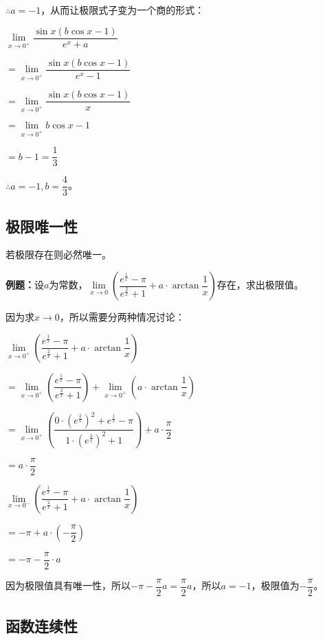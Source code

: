 \documentclass[UTF8, 12pt]{ctexart}
\begin{document}
$\therefore a=-1$，从而让极限式子变为一个商的形式：\medskip

$\lim\limits_{x\to 0^+}\dfrac{\sin x(b\cos x-1)}{e^x+a}$\medskip

$=\lim\limits_{x\to 0^+}\dfrac{\sin x(b\cos x-1)}{e^x-1}$\medskip

$=\lim\limits_{x\to 0^+}\dfrac{\sin x(b\cos x-1)}{x}$\medskip

$=\lim\limits_{x\to 0^+}b\cos x-1$\medskip

$=b-1=\dfrac{1}{3}$\medskip

$\therefore a=-1,b=\dfrac{4}{3}$。

\subsection{极限唯一性}

若极限存在则必然唯一。

\textbf{例题：}设$a$为常数，$\lim\limits_{x\to 0}\left(\dfrac{e^{\frac{1}{x}}-\pi}{e^{\frac{2}{x}}+1}+a\cdot\arctan\dfrac{1}{x}\right)$存在，求出极限值。

因为求$x\to 0$，所以需要分两种情况讨论：

\medskip

$\lim\limits_{x\to 0^+}\left(\dfrac{e^{\frac{1}{x}}-\pi}{e^{\frac{2}{x}}+1}+a\cdot\arctan\dfrac{1}{x}\right)$

$= \lim\limits_{x\to 0^+}\left(\dfrac{e^{\frac{1}{x}}-\pi}{e^{\frac{2}{x}}+1}\right)+\lim\limits_{x\to 0^+}\left(a\cdot\arctan\dfrac{1}{x}\right)$

$= \lim\limits_{x\to 0^+}\left(\dfrac{0\cdot\left(e^{\frac{2}{x}}\right)^2+e^{\frac{1}{x}}-\pi}{1\cdot\left(e^{\frac{2}{x}}\right)^2+1}\right)+a\cdot\dfrac{\pi}{2}$

$= a\cdot\dfrac{\pi}{2}$

\medskip

$\lim\limits_{x\to 0^-}\left(\dfrac{e^{\frac{1}{x}}-\pi}{e^{\frac{2}{x}}+1}+a\cdot\arctan\dfrac{1}{x}\right)$

$= -\pi+a\cdot\left(-\dfrac{\pi}{2}\right)$

$= -\pi-\dfrac{\pi}{2}\cdot a$

因为极限值具有唯一性，所以$-\pi-\dfrac{\pi}{2}a=\dfrac{\pi}{2}a$，所以$a=-1$，极限值为$-\dfrac{\pi}{2}$。

\subsection{函数连续性}
\end{document}
